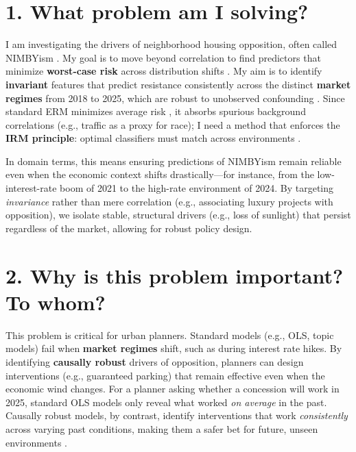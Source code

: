 \documentclass[11pt]{article}
\begin{document}
\section*{1. What problem am I solving?}
I am investigating the drivers of neighborhood housing opposition, often called NIMBYism \autocite{einstein2019}. My goal is to move beyond correlation to find predictors that minimize \textbf{worst-case risk} \autocite{buhlmann2020}
across distribution shifts \autocites{arjovsky2019}{peters2018}
. My aim is to identify \textbf{invariant} \autocite[Def.~1]{peters2016}
features that predict resistance consistently across the distinct \textbf{market regimes} \autocite{peters2016}
from 2018 to 2025, which are robust \autocite{buhlmann2020}
to unobserved confounding \autocite{peters2016}
. Since standard ERM minimizes average risk \autocite[Eq.~1]{arjovsky2019}, it absorbs spurious background correlations (e.g., traffic as a proxy for race); I need a method that enforces the \textbf{IRM principle}: optimal classifiers must match across environments \autocite[Definition~3]{arjovsky2019}.

    In domain terms, this means ensuring predictions of NIMBYism remain reliable even when the economic context shifts drastically---for instance, from the low-interest-rate boom of 2021 to the high-rate environment of 2024. By targeting \textit{invariance} rather than mere correlation (e.g., associating luxury projects with opposition), we isolate stable, structural drivers (e.g., loss of sunlight) that persist regardless of the market, allowing for robust policy design.

\section*{2. Why is this problem important? To whom?}
This problem is critical for urban planners. Standard models (e.g., OLS, topic models) fail when \textbf{market regimes} \autocite{peters2016}
shift, such as during interest rate hikes. By identifying \textbf{causally robust} \autocite{buhlmann2020}
drivers of opposition, planners can design interventions (e.g., guaranteed parking) that remain effective even when the economic wind changes.
    For a planner asking whether a concession will work in 2025, standard OLS models only reveal what worked \textit{on average} in the past. Causally robust models, by contrast, identify interventions that work \textit{consistently} across varying past conditions, making them a safer bet for future, unseen environments \autocite{buhlmann2020}.
\end{document}
